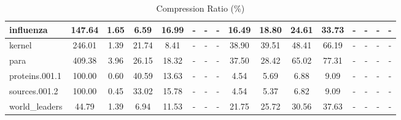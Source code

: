 \begin{table}[]
\begin{tabular}{|l|c|c|c|c|c|c|c|c|c|c|c|c|c|c|c|}
\hline
influenza & 147.64 & 1.65 & 6.59 & 16.99 & - & - & - & 16.49 & 18.80 & 24.61 & 33.73 & - & - & - & - \\
\hline
kernel & 246.01 & 1.39 & 21.74 & 8.41 & - & - & - & 38.90 & 39.51 & 48.41 & 66.19 & - & - & - & - \\
\hline
para & 409.38 & 3.96 & 26.15 & 18.32 & - & - & - & 37.50 & 28.42 & 65.02 & 77.31 & - & - & - & - \\
\hline
proteins.001.1 & 100.00 & 0.60 & 40.59 & 13.63 & - & - & - & 4.54 & 5.69 & 6.88 & 9.09 & - & - & - & - \\
\hline
sources.001.2 & 100.00 & 0.45 & 33.02 & 15.78 & - & - & - & 4.54 & 5.37 & 6.82 & 9.09 & - & - & - & - \\
\hline
world\_leaders & 44.79 & 1.39 & 6.94 & 11.53 & - & - & - & 21.75 & 25.72 & 30.56 & 37.63 & - & - & - & - \\
\hline
\end{tabular}
\caption{Compression Ratio (\%)}
\label{tab:compression_ratio}
\end{table}
